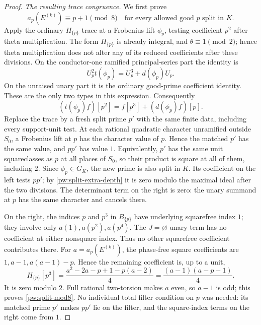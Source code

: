 \begin{proof}
\emph{The resulting trace congruence.}
We first prove
\begin{equation}\label{pw:split-mod8}
 a_p(E^{(k)})\equiv p+1\pmod8
 \quad\text{for every allowed good }p\text{ split in }K.
\end{equation}
Apply the ordinary $H_{\{p\}}$ trace at a Frobenius lift $\phi_p$,
testing coefficient $p^2$ after theta multiplication.  The form
$H_{\{p\}}$ is already integral, and $\theta\equiv1\pmod2$;
hence theta multiplication does not alter any of its reduced
coefficients after these divisions.  On the
conductor-one ramified principal-series part the identity is
\[
 U_p^2t(\phi_p)=U_p^3+d(\phi_p)U_p.
\]
On the unraised unary part it is the ordinary good-prime coefficient
identity.  These are the only two types in this expression.  Consequently
\[
 (t(\phi_p)f)[p^2]=f[p^3]+(d(\phi_p)f)[p].
\]
Replace the trace by a fresh split prime $p'$ with the same finite data,
including every support-unit test.  At each rational quadratic character
unramified outside $S_0$, a Frobenius lift at $p$ has the character value
of $p$.  Hence the matched $p'$ has the same value, and $pp'$ has value
$1$.  Equivalently, $p'$ has the same unit squareclasses as $p$ at all
places of $S_0$, so their product is square at all of them, including $2$.
Since $\phi_p\in G_K$, the new prime is also split in $K$.
Its coefficient on the left tests $pp'$; by
\eqref{pw:split-extra-depth} it is zero modulo the maximal ideal after
the two divisions.  The determinant term on the right is zero: the
unary summand at $p$ has the same character and cancels there.

On the right, the indices $p$ and $p^3$ in $B_{\{p\}}$ have underlying
squarefree index $1$; they involve only $a(1),a(p^2),a(p^4)$.  The
$J=\varnothing$ unary term has no coefficient at either nonsquare
index.  Thus no other squarefree coefficient contributes there.
For $a=a_p(E^{(k)})$, the phase-free square coefficients are
$1,a-1,a(a-1)-p$.  Hence the remaining coefficient is, up to a unit,
\[
 H_{\{p\}}[p^3]
 =\frac{a^2-2a-p+1-p(a-2)}4
 =\frac{(a-1)(a-p-1)}4.
\]
It is zero modulo $2$.  Full rational two-torsion makes $a$ even, so
$a-1$ is odd; this proves \eqref{pw:split-mod8}.  No individual total
filter condition on $p$ was needed: its matched prime $p'$ makes $pp'$
lie on the filter, and the square-index terms on the right come from $1$.


\end{proof}
